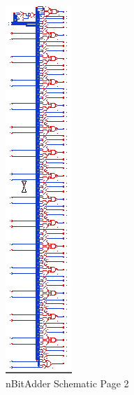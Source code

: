 \documentclass[11pt]{article}
\begin{document}
		
		\begin{figure}[H] 
			\centering 
			\includegraphics[width=\textwidth,height=\dimexpr\textheight-4\baselineskip-\abovecaptionskip-\belowcaptionskip\relax,keepaspectratio]{"Pictures/nBitAdder Schematic Page 2"}
			\caption{nBitAdder Schematic Page 2} 
			\label{fig:nBitAdder-Schematic-Page-2} 
		\end{figure}
	
\end{document}
